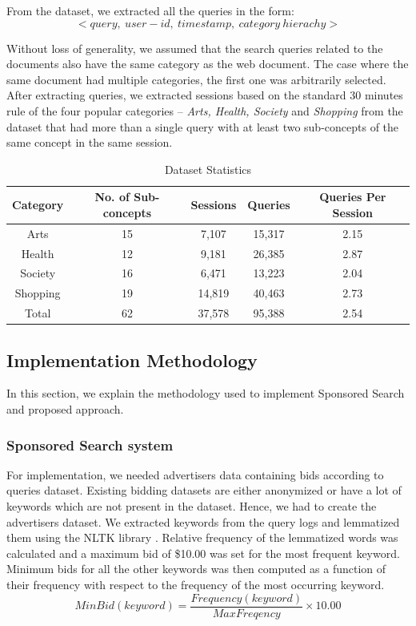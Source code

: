 From the dataset, we extracted all the queries in the form: 
\[<query,\ user-id,\ timestamp,\ category\ hierachy> \]

Without loss of generality, we assumed that the search queries related to the documents also have the same category as the web document. The case where the same document had multiple categories, the first one was arbitrarily selected. After extracting queries, we extracted sessions based on the standard 30 minutes rule of the four popular categories -- {\it Arts, Health, Society} and {\it Shopping} from the dataset that had more than a single query with at least two sub-concepts of the same concept in the same session.

\begin{table}

\centering
\caption{Dataset Statistics \label{table:trainingSetStats}}


\begin{tabular}{|c|c|c|c|c|} \hline
Category & No. of Sub-concepts & Sessions & Queries & Queries Per Session 	\\ \hline
Arts & 15 & 7,107 & 15,317 & 2.15\\ \hline
Health & 12 & 9,181 & 26,385 & 2.87 \\ \hline
Society & 16 & 6,471 & 13,223 & 2.04  \\ \hline
Shopping & 19 & 14,819 & 40,463 & 2.73 \\ \hline
Total & 62 & 37,578 & 95,388 & 2.54 \\ \hline
\end{tabular}

\end{table}

\subsection{Implementation Methodology}
In this section, we explain the methodology used to implement Sponsored Search and proposed approach.
\subsubsection{Sponsored Search system}

For implementation, we needed advertisers data containing bids according to queries dataset. Existing bidding datasets are either anonymized or have a lot of keywords which are not present in the dataset. Hence, we had to create the advertisers dataset. We extracted keywords from the query logs and lemmatized them using the NLTK library \cite{NLTK}. Relative frequency of the lemmatized words was calculated and a maximum bid of \$10.00 was set for the most frequent keyword. Minimum bids for all the other keywords was then computed as a function of their frequency with respect to the frequency of the most occurring keyword.
\begin{equation}
 Min Bid(keyword) = \frac{Frequency(keyword)}{Max Freqency} \times 10.00 
\end{equation}
 

